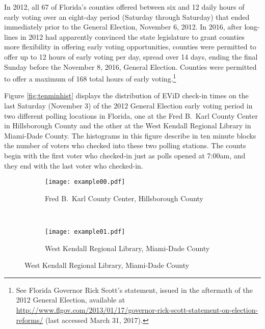 \documentclass[12pt,titlepage]{article}
\begin{document}



In 2012, all 67 of Florida's counties offered between six and 12 daily
hours of early voting over an eight-day period (Saturday through
Saturday) that ended immediately prior to the General Election,
November 6, 2012.  In 2016, after long-lines in 2012 had apparently
convinced the state legislature to grant counties more flexibility in
offering early voting opportunities, counties were permitted to offer
up to 12 hours of early voting per day, spread over 14 days, ending
the final Sunday before the November 8, 2016, General Election.
Counties were permitted to offer a maximum of 168 total hours of early
voting.\footnote{See Florida Governor Rick Scott's statement, issued
  in the aftermath of the 2012 General Election, available at
  \url{http://www.flgov.com/2013/01/17/governor-rick-scott-statement-on-election-reforms/}
  (last accessed March 31, 2017).}

Figure \ref{fig:tenminhist} displays the distribution of EViD check-in
times on the last Saturday (November 3) of the 2012 General Election
early voting period in two different polling locations in Florida, one
at the Fred B.\ Karl County Center in Hillsborough County and the
other at the West Kendall Regional Library in Miami-Dade County.  The
histograms in this figure describe in ten minute blocks the number of
voters who checked into these two polling stations.  The counts begin
with the first voter who checked-in just as polls opened at 7:00am,
and they end with the last voter who checked-in.

\begin{figure}[!ht]
  \caption{Early voting check-in times on Saturday, November 3, 2012, in two Florida locations}
  \label{fig:tenminhist}
  \centering
  \begin{subfigure}[b]{\linewidth}
    \centering\texttt{[image: example00.pdf]}
    \caption{Fred B.\ Karl County Center, Hillsborough County}
    \label{fig:karlexample}
  \end{subfigure}%
  \\
  \begin{subfigure}[b]{\linewidth}
    \centering\texttt{[image: example01.pdf]}
    \caption{West Kendall Regional Library, Miami-Dade County}
    \label{fig:kendallexample}
  \end{subfigure}
\end{figure}
\end{document}
